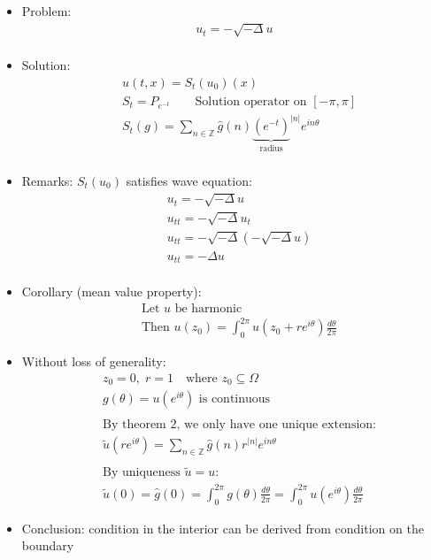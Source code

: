 \documentclass[12pt, a4paper]{article}
\begin{document}
\begin{itemize}
    \item Problem:
    \begin{align*}
        u_t = - \sqrt{-\Delta}u\\
    \end{align*}
    \item Solution:
    \begin{align*}
        &u(t, x) = S_t(u_0)(x)\\
        &S_t = P_{e^{-t}} \qquad \text{Solution operator on } [-\pi, \pi]\\
        &S_t(g) = \sum_{n\in\mathbb{Z}}\hat{g}(n){\underbrace{(e^{-t})}_\text{radius}}^{|n|}e^{in\theta}\\
    \end{align*}
    \item Remarks: $S_t(u_0)$ satisfies wave equation:
    \begin{align*}
        &u_t = - \sqrt{-\Delta}u\\
        &u_{tt} = - \sqrt{-\Delta}u_t\\
        &u_{tt} = - \sqrt{-\Delta}(- \sqrt{-\Delta}u)\\
        &u_{tt} = -\Delta u\\
    \end{align*}
    \item Corollary (mean value property):
    \begin{align*}
        &\text{Let $u$ be harmonic}\\
        &\text{Then } u(z_0) = \int_0^{2\pi}u(z_0+re^{i\theta})\frac{d\theta}{2\pi}
    \end{align*}
    \item Without loss of generality:
    \begin{align*}
        &z_0 = 0, \; r = 1 \quad \text{where }z_0 \subseteq \Omega\\
        &g(\theta) = u(e^{i\theta}) \text{ is continuous}\\\\
        &\text{By theorem 2, we only have one unique extension:}\\
        &\tilde{u}(re^{i\theta}) = \sum_{n\in\mathbb{Z}}\hat{g}(n)r^{|n|}e^{in\theta}\\\\
        &\text{By uniqueness }\tilde{u} = u:\\
        &\tilde{u}(0) = \hat{g}(0) = \int_0^{2\pi}g(\theta)\frac{d\theta}{2\pi} = \int_0^{2\pi}u(e^{i\theta})\frac{d\theta}{2\pi}
    \end{align*}
    \item Conclusion: condition in the interior can be derived from condition on the boundary\\
\end{itemize}
\end{document}
